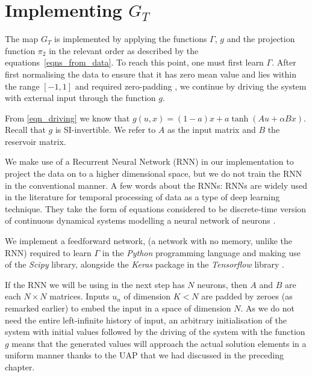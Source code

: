 \documentclass[a4paper,12pt,twoside]{report}
\begin{document}
\section{Implementing $G_T$}
The map $G_T$ is implemented by applying the functions $\Gamma$, $g$ and the projection function $\pi_2$ in the relevant order as described by the equations~\ref{eqns_from_data}. To reach this point, one must first learn $\Gamma$.
After first normalising the data to ensure that it has zero mean value and lies within the range $[-1,1]$ and required zero-padding , we continue by driving the system with external input through the function $g$.

From \eqref{eqn_driving} we know that $g(u,x) = (1-a) x + a \tanh(Au + \alpha B x)$. Recall that $g$ is SI-invertible. We refer to $A$ as the input matrix and $B$ the reservoir matrix. 

We make use of a Recurrent Neural Network (RNN) in our implementation to project the data on to a higher dimensional space, but we do not train the RNN in the conventional manner.  A few words about the RNNs: RNNs are widely used in the literature for temporal processing of data as a type of deep learning technique. They take the form of equations considered to be discrete-time version of continuous dynamical systems modelling a neural network of neurons \cite{jaeger2001echo}.

We implement a feedforward network, (a network with no memory, unlike the RNN) required to learn $\Gamma$ in the \emph{Python} programming language and making use of the \emph{Scipy} library, alongside the \emph{Keras} package in the \emph{Tensorflow} library .

If the RNN we will be using in the next step has $N$ neurons, then $A$ and $B$ are each $N\times{N}$ matrices. Inputs $u_n$ of dimension $K < N$ are padded by zeroes (as remarked earlier) to embed the input in a space of dimension $N$. As we do not need the entire left-infinite history of input, an arbitrary initialisation of the system with initial values followed by the driving of the system with the function $g$ means that the generated values will approach the actual solution elements in a uniform manner thanks to the UAP that we had discussed in the preceding chapter.
\end{document}
